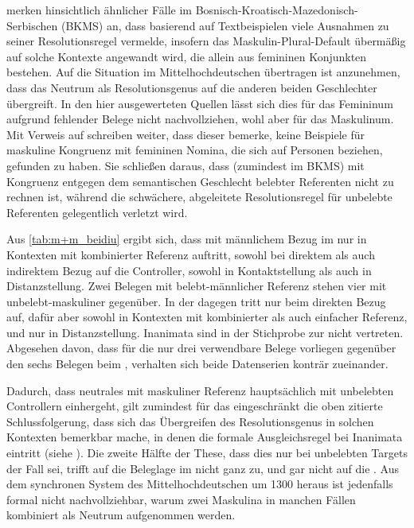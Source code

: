 \textcites[581]{wechsler2009}[190]{wechslerzlatic2003} merken hinsichtlich
ähnlicher Fälle im
Bosnisch-\allowbreak{}Kroatisch-\allowbreak{}Mazedonisch-\allowbreak{}Serbischen
(BKMS) an, dass \citet{corbett1983,corbett1991} basierend auf Textbeispielen
viele Ausnahmen zu seiner Resolutionsregel vermelde, insofern das
Maskulin-Plural-Default übermäßig auf solche Kontexte angewandt wird, die
allein aus femininen Konjunkten bestehen. Auf die Situation im
Mittelhochdeutschen übertragen ist anzunehmen, dass das Neutrum als
Resolutionsgenus auf die anderen beiden Geschlechter übergreift. In den hier
ausgewerteten Quellen lässt sich dies für das Femininum aufgrund fehlender
Belege nicht nachvollziehen, wohl aber für das Maskulinum. Mit Verweis auf
\citet[302]{corbett1991} schreiben
\textcites[581]{wechsler2009}[190]{wechslerzlatic2003} weiter, dass dieser
bemerke, keine Beispiele für maskuline Kongruenz mit femininen Nomina, die sich
auf Personen beziehen, gefunden zu haben. Sie schließen daraus, dass (zumindest
im BKMS) mit Kongruenz entgegen dem semantischen Geschlecht belebter Referenten
nicht zu rechnen ist, während die schwächere, abgeleitete Resolutionsregel für
unbelebte Referenten gelegentlich verletzt wird.

Aus \cref{tab:m+m_beidiu} ergibt sich, dass  mit männlichem Bezug
im  nur in Kontexten mit kombinierter Referenz auftritt, sowohl
bei direktem als auch indirektem Bezug auf die Controller, sowohl in
Kontaktstellung als auch in Distanzstellung. Zwei Belegen mit belebt-männlicher
Referenz stehen vier mit unbelebt-maskuliner gegenüber. In der \citet{kc}
dagegen tritt  nur beim direkten Bezug auf, dafür aber sowohl in
Kontexten mit kombinierter als auch einfacher Referenz, und nur in
Distanzstellung. Inanimata sind in der Stichprobe zur \citet{kc} nicht
vertreten. Abgesehen davon, dass für die \citet{kc} nur drei verwendbare
Belege vorliegen gegenüber den sechs Belegen beim , verhalten
sich beide Datenserien konträr zueinander.

Dadurch, dass neutrales  mit maskuliner Referenz hauptsächlich mit
unbelebten Controllern einhergeht, gilt zumindest für das 
eingeschränkt die oben zitierte Schlussfolgerung, dass sich das Übergreifen des
Resolutionsgenus in solchen Kontexten bemerkbar mache, in denen die formale
Ausgleichsregel bei Inanimata eintritt (siehe ). Die
zweite Hälfte der These, dass dies nur bei unbelebten Targets der Fall sei,
trifft auf die Beleglage im  nicht ganz zu, und gar nicht auf
die \citet{kc}. Aus dem synchronen System des Mittelhochdeutschen um 1300
heraus ist jedenfalls formal nicht nachvollziehbar, warum zwei Maskulina in
manchen Fällen kombiniert als Neutrum aufgenommen werden.

